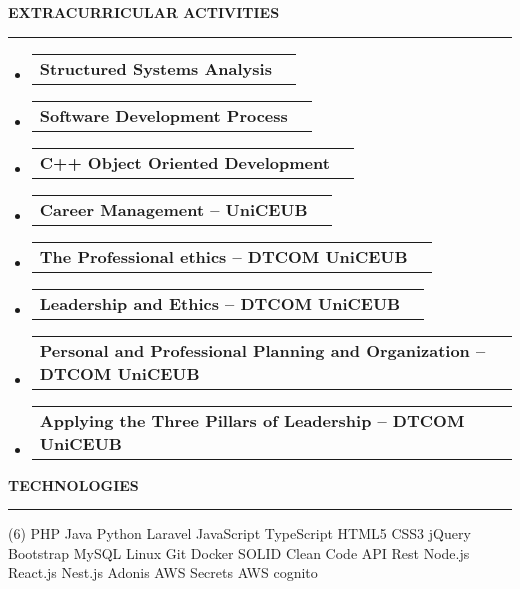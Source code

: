 \documentclass[a4paper,10pt]{article}
\makeatletter
\newcommand{\ProjectItem}[2]{
    \item
        \begin{tabular*}{0.93\textwidth}[t]{l@{\extracolsep{\fill}}r}
            \textbf{#1} & \footnotesize#2
        \end{tabular*}
}
\newcommand{\SectionTitle}[1]{
    \begin{flushleft}
    \textbf{#1}
    \noindent\textcolor{gray}{\rule{18.5cm}{1px}}
    \end{flushleft}
}
\newcommand{\SectionBegin}[0]{
    \vspace{-16pt}\begin{flushleft}
    \begin{itemize}
}
\newcommand{\SectionEnd}[0]{
    \end{itemize}
    \end{flushleft}\vspace{-2pt}
}
\makeatother
\begin{document}
\SectionTitle
    {EXTRACURRICULAR ACTIVITIES}
\SectionBegin
    \ProjectItem{Structured Systems Analysis}{}
    \ProjectItem{Software Development Process}{}
    \ProjectItem{C++ Object Oriented Development}{}
    \ProjectItem{Career Management – UniCEUB}{}
    \ProjectItem{The Professional ethics – DTCOM UniCEUB}{}
    \ProjectItem{Leadership and Ethics – DTCOM UniCEUB}{}
    \ProjectItem{Personal and Professional Planning and Organization – DTCOM UniCEUB}{}
    \ProjectItem{Applying the Three Pillars of Leadership – DTCOM UniCEUB}{}
\SectionEnd
    
\SectionTitle
    {TECHNOLOGIES}
\begin{tasks}[style=itemize, column-sep=-13mm, label-align=left, label-offset={0mm}](6)%
\task PHP
\task Java
\task Python
\task Laravel
\task JavaScript
\task TypeScript
\task HTML5
\task CSS3
\task jQuery
\task Bootstrap
\task MySQL
\task Linux
\task Git
\task Docker
\task SOLID
\task Clean Code
\task API Rest
\task Node.js
\task React.js
\task Nest.js 
\task Adonis 
\task AWS Secrets
\task AWS cognito 
\end{tasks}
\end{document}
